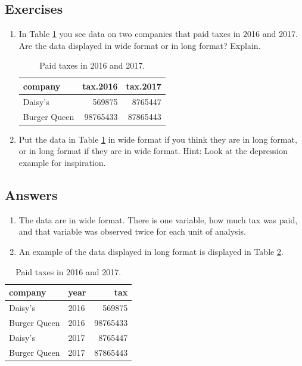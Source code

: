 \documentclass[]{book}\usepackage[]{graphicx}\usepackage[]{color}
\begin{document}
\subsection{Exercises}


\begin{enumerate}

\item In Table \ref{tab:taxes} you see data on two companies that paid taxes in 2016 and 2017. Are the data displayed in wide format or in long format? Explain.

\begin{table}[ht]
\centering
\caption{Paid taxes in 2016 and 2017.} 
\label{tab:taxes}
\begin{tabular}{lrr}
  \hline
company & tax.2016 & tax.2017 \\ 
  \hline
Daisy's & 569875 & 8765447 \\ 
  Burger Queen & 98765433 & 87865443 \\ 
   \hline
\end{tabular}
\end{table}


\item Put the data in Table \ref{tab:taxes} in wide format if you think they are in long format, or in long format if they are in wide format. Hint: Look at the depression example for inspiration.



\end{enumerate}

\subsection{Answers}

\begin{enumerate}

\item The data are in wide format. There is one variable, how much tax was paid, and that variable was observed twice for each unit of analysis.


\item An example of the data displayed in long format is displayed in Table \ref{tab:taxeslong}.


\end{enumerate}


\begin{table}[ht]
\centering
\caption{Paid taxes in 2016 and 2017.} 
\label{tab:taxeslong}
\begin{tabular}{llr}
  \hline
company & year & tax \\ 
  \hline
Daisy's & 2016 & 569875 \\ 
  Burger Queen & 2016 & 98765433 \\ 
  Daisy's & 2017 & 8765447 \\ 
  Burger Queen & 2017 & 87865443 \\ 
   \hline
\end{tabular}
\end{table}
\end{document}
